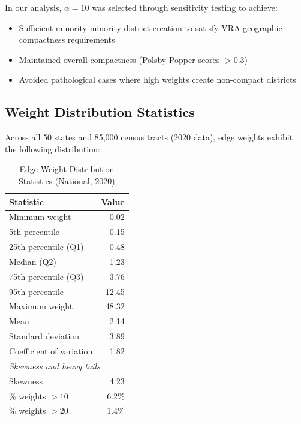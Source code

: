 In our analysis, $\alpha = 10$ was selected through sensitivity testing to achieve:
\begin{itemize}
\item Sufficient minority-minority district creation to satisfy VRA geographic compactness requirements
\item Maintained overall compactness (Polsby-Popper scores $> 0.3$)
\item Avoided pathological cases where high weights create non-compact districts
\end{itemize}

\subsection{Weight Distribution Statistics}

Across all 50 states and 85,000 census tracts (2020 data), edge weights exhibit the following distribution:

\begin{table}[h]
\centering
\caption{Edge Weight Distribution Statistics (National, 2020)}
\begin{tabular}{lr}
\toprule
\textbf{Statistic} & \textbf{Value} \\
\midrule
Minimum weight & 0.02 \\
5th percentile & 0.15 \\
25th percentile (Q1) & 0.48 \\
Median (Q2) & 1.23 \\
75th percentile (Q3) & 3.76 \\
95th percentile & 12.45 \\
Maximum weight & 48.32 \\
Mean & 2.14 \\
Standard deviation & 3.89 \\
Coefficient of variation & 1.82 \\
\midrule
\multicolumn{2}{l}{\textit{Skewness and heavy tails}} \\
Skewness & 4.23 \\
\% weights $> 10$ & 6.2\% \\
\% weights $> 20$ & 1.4\% \\
\bottomrule
\end{tabular}
\end{table}


